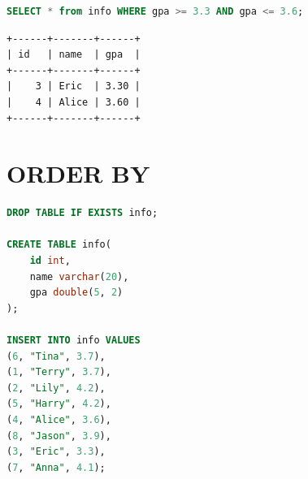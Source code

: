 \documentclass[12pt, openany, oneside]{book}
\begin{document}
\begin{table}[H]
	\centering
	\caption{运算符}
\end{table}


\begin{lstlisting}[language=SQL]
SELECT * from info WHERE gpa >= 3.3 AND gpa <= 3.6;
\end{lstlisting}

\begin{tcolorbox}
	\begin{verbatim}
+------+-------+------+
| id   | name  | gpa  |
+------+-------+------+
|    3 | Eric  | 3.30 |
|    4 | Alice | 3.60 |
+------+-------+------+
\end{verbatim}
\end{tcolorbox}

\newpage

\chapter{ORDER BY}

\vspace{0.5cm}


\begin{lstlisting}[language=SQL]
DROP TABLE IF EXISTS info;

CREATE TABLE info(
    id int,
    name varchar(20),
    gpa double(5, 2)
);

INSERT INTO info VALUES
(6, "Tina", 3.7),
(1, "Terry", 3.7),
(2, "Lily", 4.2),
(5, "Harry", 4.2),
(4, "Alice", 3.6),
(8, "Jason", 3.9),
(3, "Eric", 3.3),
(7, "Anna", 4.1);
\end{lstlisting}
\end{document}
